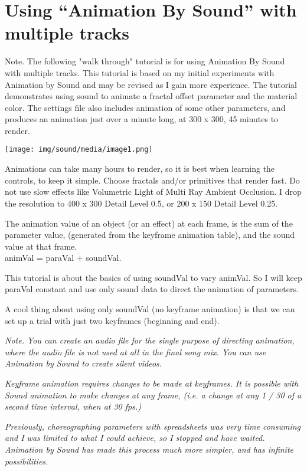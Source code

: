 \section{Using ``Animation By Sound'' with multiple
tracks}\label{using-animation-by-sound-with-multiple-tracks}

Note. The following "walk through" tutorial is for using Animation By Sound
with multiple tracks. This tutorial is based on my initial experiments
with Animation by Sound and may be revised as I gain more experience. The
tutorial demonstrates using sound to animate a fractal offset parameter
and the material color. The settings file also includes animation of
some other parameters, and produces an animation just over a minute
long, at 300 x 300, 45 minutes to render.

\texttt{[image: img/sound/media/image1.png]}

Animations can take many hours to render, so it is best when learning
the controls, to keep it simple. Choose fractals and/or primitives that
render fast. Do not use slow effects like Volumetric Light of Multi Ray
Ambient Occlusion. I drop the resolution to 400 x 300 Detail Level 0.5,
or 200 x 150 Detail Level 0.25.

The animation value of an object (or an effect) at each frame, is the
sum of the parameter value, (generated from the keyframe animation
table), and the sound value at that frame.\\
animVal = paraVal + soundVal.

This tutorial is about the basics of using soundVal to vary animVal. So
I will keep paraVal constant and use only sound data to direct the
animation of parameters.

A cool thing about using only soundVal (no keyframe animation) is that
we can set up a trial with just two keyframes (beginning and end).

\emph{Note. You can create an audio file for the single purpose of
directing animation, where the audio file is not used at all in the
final song mix. You can use Animation by Sound to create silent videos.}

\emph{Keyframe animation requires changes to be made at keyframes. It is
possible with Sound animation to make changes at any frame, (i.e. a
change at any 1 / 30 of a second time interval, when at 30 fps.)}

\emph{Previously, choreographing parameters with spreadsheets was very
time consuming and I was limited to what I could achieve, so I stopped
and have waited. Animation by Sound has made this process much more simpler,
and has infinite possibilities.}

